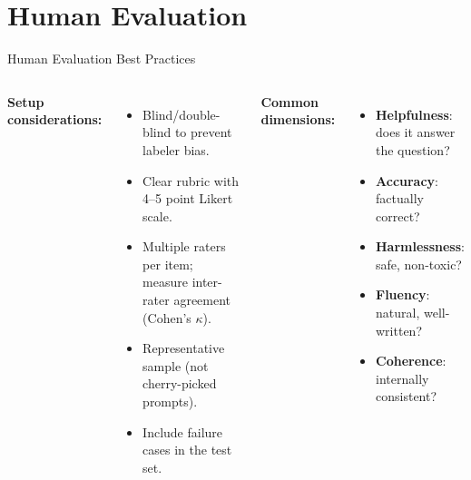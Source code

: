 \documentclass[aspectratio=169,10pt]{beamer}
\begin{document}
\section{Human Evaluation}

\begin{frame}{Human Evaluation Best Practices}
  \begin{columns}[T]
      \textbf{Setup considerations:}
      \begin{itemize}
        \item Blind/double-blind to prevent labeler bias.
        \item Clear rubric with 4–5 point Likert scale.
        \item Multiple raters per item; measure inter-rater agreement (Cohen's $\kappa$).
        \item Representative sample (not cherry-picked prompts).
        \item Include failure cases in the test set.
      \end{itemize}
      \textbf{Common dimensions:}
      \begin{itemize}
        \item \textbf{Helpfulness}: does it answer the question?
        \item \textbf{Accuracy}: factually correct?
        \item \textbf{Harmlessness}: safe, non-toxic?
        \item \textbf{Fluency}: natural, well-written?
        \item \textbf{Coherence}: internally consistent?
      \end{itemize}
  \end{columns}
\end{frame}
\end{document}
